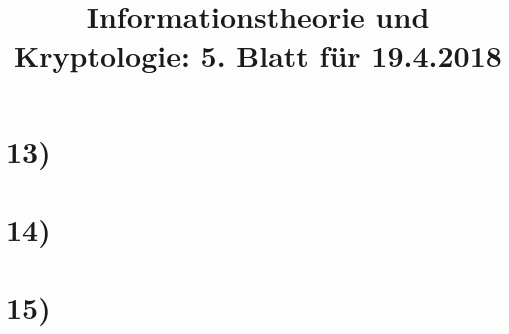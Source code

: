 \documentclass[11pt,a4paper]{article}
\begin{document}
  \title{Informationstheorie und Kryptologie: 5. Blatt für 19.4.2018}
  \maketitle

  \section*{13)}

  

  \section*{14)}
  \section*{15)}
\end{document}
